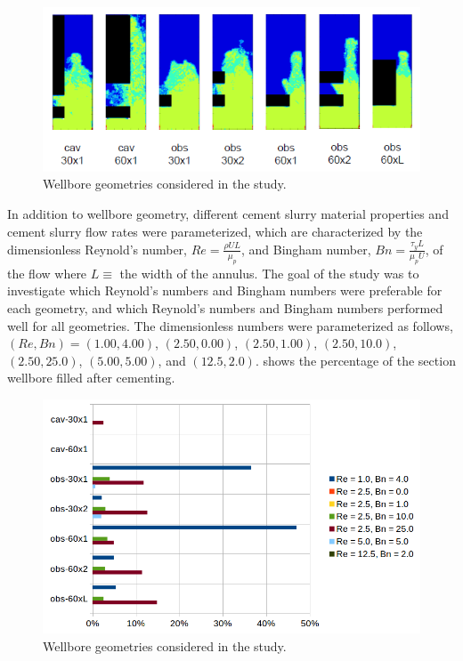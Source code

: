 \documentclass[pdftex,ms]{pittetd}
\begin{document}
\begin{figure}
\includegraphics[width=\linewidth]{figs/wellbore-geometries}
\caption{Wellbore geometries considered in the study.}
\label{fig:wellbore-geometries}
\end{figure}

In addition to wellbore geometry, different cement slurry material properties and cement slurry flow rates were parameterized, which are characterized by the dimensionless Reynold's number, $Re = \frac{\rho U L}{\mu_p}$, and Bingham number, $Bn = \frac{\tau_y L}{\mu_p U}$, of the flow where $L \equiv $ the width of the annulus.
The goal of the study was to investigate which Reynold's numbers and Bingham numbers were preferable for each geometry, and which Reynold's numbers and Bingham numbers performed well for all geometries.
The dimensionless numbers were parameterized as follows, $(Re, Bn) = (1.00, 4.00)$,  $(2.50, 0.00)$, $(2.50, 1.00)$, $(2.50, 10.0)$, $(2.50, 25.0)$, $(5.00, 5.00)$, and $(12.5, 2.0)$.
 shows the percentage of the \anh \hspace{0.05cm} section wellbore filled after cementing.

\begin{figure}
\centering
\includegraphics[width=\linewidth]{figs/percent_filled}
\caption{Wellbore geometries considered in the study.}
\label{fig:percent-filled}
\end{figure}
\end{document}
